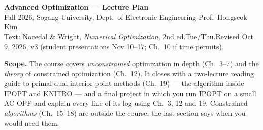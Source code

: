\documentclass[10pt,a4paper]{article}
\begin{document}
{\LARGE\bfseries Advanced Optimization --- Lecture Plan}\\[0.2em]
{\large Fall 2026, Sogang University, Dept.\ of Electronic Engineering \quad Prof.\ Hongseok Kim}\\[0.2em]
{\small Text: Nocedal \& Wright, \emph{Numerical Optimization}, 2nd ed.\quad Tue/Thu.\quad Revised Oct 9, 2026, v3
(student presentations Nov 10--17; Ch.~10 if time permits).}

\textbf{Scope.} The course covers \emph{unconstrained} optimization in depth (Ch.~3--7) and the \emph{theory} of
constrained optimization (Ch.~12). It closes with a two-lecture reading guide to primal-dual interior-point
methods (Ch.~19) --- the algorithm inside IPOPT and KNITRO --- and a final project in which you run IPOPT on a
small AC OPF and explain every line of its log using Ch.~3, 12 and 19. Constrained \emph{algorithms}
(Ch.~15--18) are outside the course; the last section says when you would need them.
\end{document}
